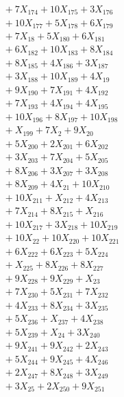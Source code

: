 \documentclass[a4paper,10pt]{article}
\begin{document}
{\begin{align}
&\quad  + 7X_{174} + 10X_{175} + 3X_{176} \\[0.5ex]
&\quad  + 10X_{177} + 5X_{178} + 6X_{179} \\[0.5ex]
&\quad  + 7X_{18} + 5X_{180} + 6X_{181} \\[0.5ex]
&\quad  + 6X_{182} + 10X_{183} + 8X_{184} \\[0.5ex]
&\quad  + 8X_{185} + 4X_{186} + 3X_{187} \\[0.5ex]
&\quad  + 3X_{188} + 10X_{189} + 4X_{19} \\[0.5ex]
&\quad  + 9X_{190} + 7X_{191} + 4X_{192} \\[0.5ex]
&\quad  + 7X_{193} + 4X_{194} + 4X_{195} \\[0.5ex]
&\quad  + 10X_{196} + 8X_{197} + 10X_{198} \\[0.5ex]
&\quad  + X_{199} + 7X_{2} + 9X_{20} \\[0.5ex]
&\quad  + 5X_{200} + 2X_{201} + 6X_{202} \\[0.5ex]
&\quad  + 3X_{203} + 7X_{204} + 5X_{205} \\[0.5ex]
&\quad  + 8X_{206} + 3X_{207} + 3X_{208} \\[0.5ex]
&\quad  + 8X_{209} + 4X_{21} + 10X_{210} \\[0.5ex]
&\quad  + 10X_{211} + X_{212} + 4X_{213} \\[0.5ex]
&\quad  + 7X_{214} + 8X_{215} + X_{216} \\[0.5ex]
&\quad  + 10X_{217} + 3X_{218} + 10X_{219} \\[0.5ex]
&\quad  + 10X_{22} + 10X_{220} + 10X_{221} \\[0.5ex]
&\quad  + 6X_{222} + 6X_{223} + 5X_{224} \\[0.5ex]
&\quad  + X_{225} + 8X_{226} + 8X_{227} \\[0.5ex]
&\quad  + 9X_{228} + 9X_{229} + X_{23} \\[0.5ex]
&\quad  + 7X_{230} + 5X_{231} + 7X_{232} \\[0.5ex]
&\quad  + 4X_{233} + 8X_{234} + 3X_{235} \\[0.5ex]
&\quad  + 5X_{236} + X_{237} + 4X_{238} \\[0.5ex]
&\quad  + 5X_{239} + X_{24} + 3X_{240} \\[0.5ex]
&\quad  + 9X_{241} + 9X_{242} + 2X_{243} \\[0.5ex]
&\quad  + 5X_{244} + 9X_{245} + 4X_{246} \\[0.5ex]
&\quad  + 2X_{247} + 8X_{248} + 3X_{249} \\[0.5ex]
&\quad  + 3X_{25} + 2X_{250} + 9X_{251} \\[0.5ex]

\end{align}}
\end{document}
